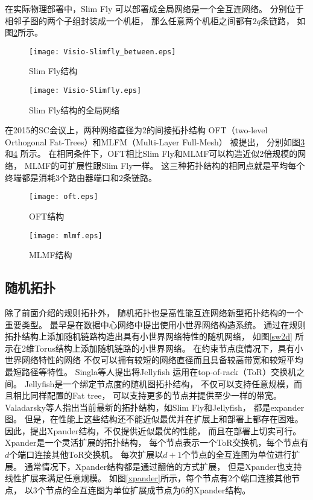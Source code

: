 在实际物理部署中，Slim Fly 可以部署成全局网络是一个全互连网络。
分别位于相邻子图的两个子组封装成一个机柜，
那么任意两个机柜之间都有$2q$条链路，
如图\ref{slimfly}所示。

\begin{figure}[htp]
  \centering
    \texttt{[image: Visio-Slimfly\_between.eps]}
    \caption{Slim Fly结构}
    \label{slimflyone}
\end{figure}

\begin{figure}[htp]
  \centering
    \texttt{[image: Visio-Slimfly.eps]}
    \caption{Slim Fly结构的全局网络}
    \label{slimfly}
\end{figure}

在2015的SC会议上，两种网络直径为2的间接拓扑结构
OFT（two-level Orthogonal Fat-Trees）和MLFM（Multi-Layer Full-Mesh）
被提出，
分别如图\ref{oft}和\ref{mlmf} 所示。
在相同条件下，OFT相比Slim Fly和MLMF可以构造近似2倍规模的网络，
MLMF的可扩展性跟Slim Fly一样。
这三种拓扑结构的相同点就是平均每个终端都是消耗3个路由器端口和2条链路。

\begin{figure}[htp]
  \centering
    \texttt{[image: oft.eps]}
    \caption{OFT结构}
    \label{oft}
\end{figure}

\begin{figure}[htp]
  \centering
    \texttt{[image: mlmf.eps]}
    \caption{MLMF结构}
    \label{mlmf}
\end{figure}

\subsection{随机拓扑}

除了前面介绍的规则拓扑外，
随机拓扑也是高性能互连网络新型拓扑结构的一个重要类型。
最早是在数据中心网络中提出使用小世界网络构造系统。
通过在规则拓扑结构上添加随机链路构造出具有小世界网络特性的随机网络，
如图\ref{sw2d} 所示在2维Torus结构上添加随机链路的小世界网络。
在约束节点度情况下，具有小世界网络特性的网络
不仅可以拥有较短的网络直径而且具备较高带宽和较短平均最短路径等特性。
Singla等人提出将Jellyfish
运用在top-of-rack（ToR）交换机之间。
Jellyfish是一个绑定节点度的随机图拓扑结构，
不仅可以支持任意规模，而且相比同样配置的Fat tree，
可以支持更多的节点并提供至少一样的带宽。
Valadarsky等人指出当前最新的拓扑结构，如Slim Fly和Jellyfish，
都是expander图。
但是，在性能上这些结构还不能近似最优并在扩展上和部署上都存在困难。
因此，提出Xpander结构，不仅提供近似最优的性能，
而且在部署上切实可行。
Xpander是一个灵活扩展的拓扑结构，
每个节点表示一个ToR交换机，每个节点有$d$个端口连接其他ToR交换机。
每次扩展以$d+1$个节点的全互连图为单位进行扩展。
通常情况下，Xpander结构都是通过翻倍的方式扩展，
但是Xpander也支持线性扩展来满足任意规模。
如图\ref{xpander}所示，每个节点有2个端口连接其他节点，
以3个节点的全互连图为单位扩展成节点为6的Xpander结构。

